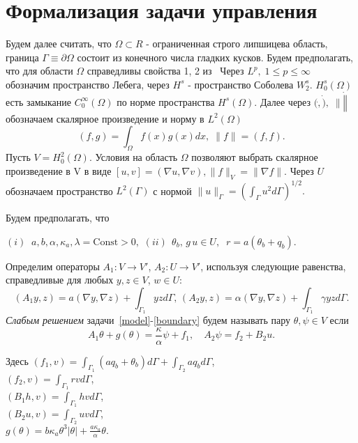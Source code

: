 \section{Формализация задачи управления}\label{sec:formalization}
Будем далее считать, что $\Omega \subset R$ - ограниченная строго липшицева область,
граница $\Gamma \equiv \partial \Omega$ состоит из конечного числа гладких кусков.
Будем предполагать, что для области $\Omega$ справедливы свойства 1, 2 из~\cite{}
Через $L^p, \; 1 \leq p \leq \infty$ обозначим пространство Лебега, через $H^s$ - пространство Соболева $W^s_2$.
$H^s_0(\Omega)$ есть замыкание $C^\infty_0(\Omega)$ по норме пространства $H^s(\Omega)$.
Далее через $(\dot, \dot), \; \| \dot \|$ обозначаем скалярное произведение и норму в $L^2(\Omega)$
\[
    (f, g) = \int_\Omega f(x)g(x)dx, \; \| f \| = (f, f).
\]
Пусть $V = H^2_0(\Omega)$.
Условия на область $\Omega$ позволяют выбрать скалярное произведение в V в виде
$[u, v] = (\nabla u, \nabla v), \| f \|_V = \| \nabla f \|$.
Через $U$ обозначаем пространство $L^2(\Gamma)$ с нормой
$\|u\|_\Gamma=\left(\int_\Gamma u^2 d\Gamma\right)^{1/2}.$

Будем предполагать, что

$(i) \;\; a,b,\alpha,\kappa_a, \lambda =\textrm{Const} > 0 ,$
$(ii) \;\, \theta_b, \,g \, u \in U,\;\; r=a(\theta_b+q_b).$


Определим операторы $A_1\colon V \to V'$, $A_2\colon U \to V'$, используя
следующие равенства, справедливые для любых $y,z \in V$, $w\in U$:
\[
    (A_1 y,z) = a(\nabla y, \nabla z) + \int_{\Gamma_1} yz d\Gamma, \,
    (A_2 y, z) = \alpha (\nabla y, \nabla z) + \int_{\Gamma_1} \gamma yz d\Gamma.
\]
    {\it Слабым решением} задачи~\eqref{model}-\eqref{boundary} будем называть
пару $\theta, \psi \in V$ если
\begin{equation}
    \label{weak}
    A_1\theta  + g(\theta) = \frac{\kappa}{\alpha} \psi + f_1, \quad
    A_2\psi = f_2 + B_2 u.
\end{equation}

Здесь
$(f_1, v) = \int_{\Gamma_1} (a q_b + \theta_b)d\Gamma + \int_{\Gamma_2} a q_b d\Gamma$,\\
$(f_2, v) = \int_{\Gamma_1} r v d\Gamma$,\\
$(B_1 h,v) = \int_{\Gamma_1} h v d\Gamma$,\\
$(B_2 u, v) = \int_{\Gamma_2} u v d\Gamma$,\\
$g(\theta) = b\kappa_a \theta^3 |\theta| + \frac{a\kappa_a}{\alpha}\theta.$


